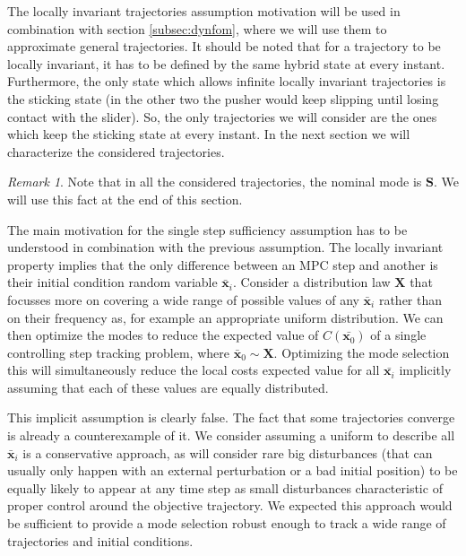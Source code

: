 \documentclass[12,twoside]{TFG-GM}
\theoremstyle{definition}
\theoremstyle{remark}
\newtheorem{remark}[theorem]{Remark}
\newcommand*\diff[1]{\bar{#1}}
\begin{document}
The locally invariant trajectories assumption motivation will be used in combination with section \ref{subsec:dynfom}, where we will use them to approximate general trajectories. It should be noted that for a trajectory to be locally invariant, it has to be defined by the same hybrid state at every instant. Furthermore, the only state which allows infinite locally invariant trajectories is the sticking state (in the other two the pusher would keep slipping until losing contact with the slider). So, the only trajectories we will consider are the ones which keep the sticking state at every instant. In the next section we will characterize the considered trajectories.

\begin{remark}
Note that in all the considered trajectories, the nominal mode is $\textbf{S}$. We will use this fact at the end of this section.
\end{remark}

The main motivation for the single step sufficiency assumption has to be understood in combination with the previous assumption. The locally invariant property implies that the only difference between an MPC step and another is their initial condition random variable $\diff{\textbf{x}}_i$. Consider a distribution law $\textbf{X}$ that focusses more on covering a wide range of possible values of any $\diff{\textbf{x}}_i$ rather than on their frequency as, for example an appropriate uniform distribution. We can then optimize the modes to reduce the expected value of $C(\diff{\textbf{x}_0})$ of a single controlling step tracking problem, where $\diff{\textbf{x}}_0 \sim \textbf{X}$. Optimizing the mode selection this will simultaneously reduce the local costs expected value for all $\diff{\textbf{x}_i}$ implicitly assuming that each of these values are equally distributed.

This implicit assumption is clearly false. The fact that some trajectories converge is already a counterexample of it. We consider assuming a uniform to describe all $\diff{\textbf{x}}_i$ is a conservative approach, as will consider rare big disturbances (that can usually only happen with an external perturbation or a bad initial position) to be equally likely to appear at any time step as small disturbances characteristic of proper control around the objective trajectory. We expected this approach would be sufficient to provide a mode selection robust enough to track a wide range of trajectories and initial conditions.
\end{document}
